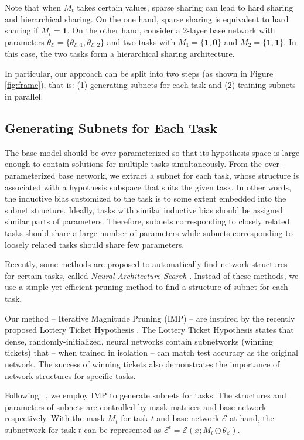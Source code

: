 \documentclass[letterpaper]{article} %
\newcommand{\citet}[1]{\citeauthor{#1}~\shortcite{#1}}
\begin{document}
Note that when $M_t$ takes certain values, sparse sharing can lead to hard sharing and hierarchical sharing. On the one hand, sparse sharing is equivalent to hard sharing if $M_t = \mathbf{1}$. On the other hand, consider a 2-layer base network with parameters $\theta_\mathcal{E} = \{\theta_{\mathcal{E}, 1},\theta_{\mathcal{E}, 2}\}$ and two tasks with $M_1 = \{\mathbf{1}, \mathbf{0}\}$ and $M_2 = \{\mathbf{1}, \mathbf{1}\}$. In this case, the two tasks form a hierarchical sharing architecture.

In particular, our approach can be split into two steps (as shown in Figure \ref{fig:frame}), that is: (1) generating subnets for each task and (2) training subnets in parallel.

\subsection{Generating Subnets for Each Task}
The base model should be over-parameterized so that its hypothesis space is large enough to contain solutions for multiple tasks simultaneously. From the over-parameterized base network, we extract a subnet for each task, whose structure is associated with a hypothesis subspace that suits the given task. In other words, the inductive bias customized to the task is to some extent embedded into the subnet structure. Ideally, tasks with similar inductive bias should be assigned similar parts of parameters. Therefore, subnets corresponding to closely related tasks should share a large number of parameters while subnets corresponding to loosely related tasks should share few parameters.

Recently, some methods are proposed to automatically find network structures for certain tasks, called \emph{Neural Architecture Search} \cite{DBLP:conf/iclr/ZophL17,DBLP:conf/aaai/RealAHL19}. Instead of these methods, we use a simple yet efficient pruning method to find a structure of subnet for each task.

Our method -- Iterative Magnitude Pruning (IMP) -- are inspired by the recently proposed Lottery Ticket Hypothesis \cite{DBLP:conf/iclr/FrankleC19}. The Lottery Ticket Hypothesis states that dense, randomly-initialized, neural networks contain subnetworks (winning tickets) that -- when trained in isolation -- can match test accuracy as the original network. The success of winning tickets also demonstrates the importance of network structures for specific tasks.

Following \citet{DBLP:conf/iclr/FrankleC19}, we employ IMP to generate subnets for tasks. The structures and parameters of subnets are controlled by mask matrices and base network respectively. With the mask $M_t$ for task $t$ and base network $\mathcal{E}$ at hand, the subnetwork for task $t$ can be represented as $\mathcal{E}^t=\mathcal{E}(x;M_t\odot \theta_\mathcal{E})$.
\end{document}
